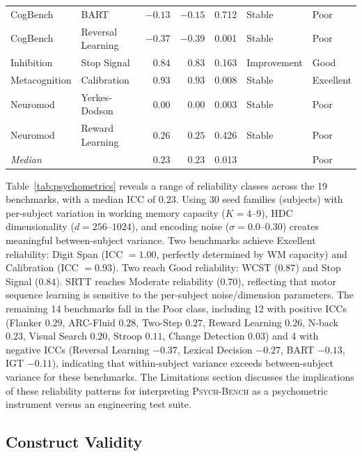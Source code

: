\documentclass[11pt,letterpaper]{article}
\newcommand{\psychbench}{\textsc{Psych-Bench}}
\begin{document}
\begin{table}[t]
\begin{tabular}{@{}llrrcll@{}}
CogBench      & BART               & $-0.13$ & $-0.15$ & 0.712 & Stable      & Poor \\
CogBench      & Reversal Learning  & $-0.37$ & $-0.39$ & 0.001 & Stable      & Poor \\
Inhibition    & Stop Signal        &  $\mathbf{0.84}$ &  $\mathbf{0.83}$ & 0.163 & Improvement & Good \\
Metacognition & Calibration        &  $\mathbf{0.93}$ &  $\mathbf{0.93}$ & 0.008 & Stable      & Excellent \\
Neuromod      & Yerkes-Dodson      &  $0.00$ &  $0.00$ & 0.003 & Stable      & Poor \\
Neuromod      & Reward Learning    &  $0.26$ &  $0.25$ & 0.426 & Stable      & Poor \\
\midrule
\multicolumn{2}{l}{\emph{Median}} & $0.23$ & $0.23$ & 0.013 & & Poor \\
\bottomrule
\end{tabular}
\end{table}

Table~\ref{tab:psychometrics} reveals a range of reliability classes across the 19 benchmarks, with a median ICC of $0.23$. Using 30 seed families (subjects) with per-subject variation in working memory capacity ($K = 4$--$9$), HDC dimensionality ($d = 256$--$1024$), and encoding noise ($\sigma = 0.0$--$0.30$) creates meaningful between-subject variance. Two benchmarks achieve Excellent reliability: Digit Span (ICC $= 1.00$, perfectly determined by WM capacity) and Calibration (ICC $= 0.93$). Two reach Good reliability: WCST ($0.87$) and Stop Signal ($0.84$). SRTT reaches Moderate reliability ($0.70$), reflecting that motor sequence learning is sensitive to the per-subject noise/dimension parameters. The remaining 14 benchmarks fall in the Poor class, including 12 with positive ICCs (Flanker $0.29$, ARC-Fluid $0.28$, Two-Step $0.27$, Reward Learning $0.26$, N-back $0.23$, Visual Search $0.20$, Stroop $0.11$, Change Detection $0.03$) and 4 with negative ICCs (Reversal Learning $-0.37$, Lexical Decision $-0.27$, BART $-0.13$, IGT $-0.11$), indicating that within-subject variance exceeds between-subject variance for these benchmarks. The Limitations section discusses the implications of these reliability patterns for interpreting \psychbench{} as a psychometric instrument versus an engineering test suite.

\subsection{Construct Validity}
\end{document}
